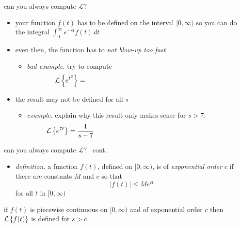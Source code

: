 \documentclass[dvipsnames,colorlinks]{beamer}
\begin{document}
\begin{frame}{can you always compute $\mathcal{L}$?}

\begin{itemize}
\item your function $f(t)$ has to be defined on the interval $[0,\infty)$ so you can do the integral $\int_0^\infty e^{-st} f(t)\,dt$
\item even then, the function has to \emph{not blow-up too fast}
    \begin{itemize}
    \item \emph{bad example.}  try to compute
      $$\LL{e^{t^2}} = \hspace{70mm}$$
    \end{itemize}
\item the result may not be defined for all $s$
    \begin{itemize}
    \item \emph{example.}  explain why this result only makes sense for $s>7$:
      $$\LL{e^{7t}} = \frac{1}{s-7}\hspace{70mm}$$
    \end{itemize}

\end{itemize}
\end{frame}


\begin{frame}{can you always compute $\mathcal{L}$? \, cont.}

\begin{itemize}
\item \emph{definition.}  a function $f(t)$, defined on $[0,\infty)$, is of \emph{exponential order} $c$ if there are constants $M$ and $c$ so that
    $$|f(t)| \le M e^{ct}$$
for all $t$ in $[0,\infty)$
\end{itemize}

\bigskip
\begin{theorem}
if $f(t)$ is piecewise continuous on $[0,\infty)$ and of exponential order $c$ then $\mathcal{L}\left\{f(t)\right\}$ is defined for $s>c$
\end{theorem}
\end{frame}
\end{document}
